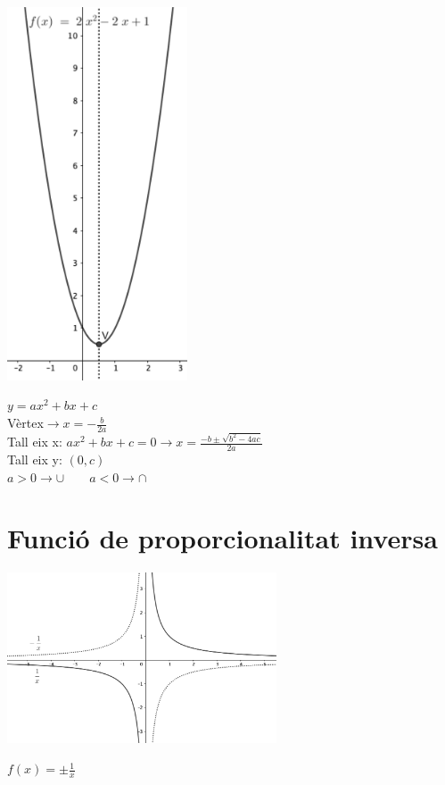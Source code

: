 \documentclass{article}
\begin{document}
\begin{minipage}{0.5\textwidth}
	\includegraphics[width=0.4\textwidth]{eq_2n_grau.png}
\end{minipage}
\begin{minipage}{0.5\textwidth}
	 \vspace{0.5cm}
	$y=ax^2+bx+c$\\
	Vèrtex$\rightarrow x=-\frac{b}{2a}$\\
	Tall eix x: $ax^2+bx+c=0\rightarrow x=\frac{-b \pm \sqrt{b^2-4ac}}{2a}$\\
	Tall eix y: $(0,c)$\\
	$a>0\rightarrow \cup \qquad a<0\rightarrow \cap$\\
	
\end{minipage}

\section{Funció de proporcionalitat inversa}
\begin{minipage}{0.5\textwidth}
	\includegraphics[width=0.6\textwidth]{funcio_prop_inversa.png}
\end{minipage}
\begin{minipage}{0.5\textwidth}
	\vspace{0.5 cm}
	$f(x)=\pm \frac{1}{x}$\\
\end{minipage}
\end{document}

